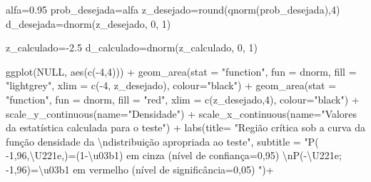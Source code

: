 \documentclass[
]{book}
\newenvironment{Shaded}{\begin{snugshade}}{\end{snugshade}}
\newcommand{\AttributeTok}[1]{\textcolor[rgb]{0.77,0.63,0.00}{#1}}
\newcommand{\ConstantTok}[1]{\textcolor[rgb]{0.00,0.00,0.00}{#1}}
\newcommand{\DecValTok}[1]{\textcolor[rgb]{0.00,0.00,0.81}{#1}}
\newcommand{\FloatTok}[1]{\textcolor[rgb]{0.00,0.00,0.81}{#1}}
\newcommand{\FunctionTok}[1]{\textcolor[rgb]{0.00,0.00,0.00}{#1}}
\newcommand{\NormalTok}[1]{#1}
\newcommand{\OtherTok}[1]{\textcolor[rgb]{0.56,0.35,0.01}{#1}}
\newcommand{\SpecialCharTok}[1]{\textcolor[rgb]{0.00,0.00,0.00}{#1}}
\newcommand{\StringTok}[1]{\textcolor[rgb]{0.31,0.60,0.02}{#1}}
\begin{document}
\begin{Shaded}
\begin{Highlighting}[]
\NormalTok{alfa}\OtherTok{=}\FloatTok{0.95}
\NormalTok{prob\_desejada}\OtherTok{=}\NormalTok{alfa}
\NormalTok{z\_desejado}\OtherTok{=}\FunctionTok{round}\NormalTok{(}\FunctionTok{qnorm}\NormalTok{(prob\_desejada),}\DecValTok{4}\NormalTok{)}
\NormalTok{d\_desejada}\OtherTok{=}\FunctionTok{dnorm}\NormalTok{(z\_desejado, }\DecValTok{0}\NormalTok{, }\DecValTok{1}\NormalTok{)}

\NormalTok{z\_calculado}\OtherTok{=}\SpecialCharTok{{-}}\FloatTok{2.5}
\NormalTok{d\_calculado}\OtherTok{=}\FunctionTok{dnorm}\NormalTok{(z\_calculado, }\DecValTok{0}\NormalTok{, }\DecValTok{1}\NormalTok{)}




\FunctionTok{ggplot}\NormalTok{(}\ConstantTok{NULL}\NormalTok{, }\FunctionTok{aes}\NormalTok{(}\FunctionTok{c}\NormalTok{(}\SpecialCharTok{{-}}\DecValTok{4}\NormalTok{,}\DecValTok{4}\NormalTok{))) }\SpecialCharTok{+}
  \FunctionTok{geom\_area}\NormalTok{(}\AttributeTok{stat =} \StringTok{"function"}\NormalTok{, }
            \AttributeTok{fun =}\NormalTok{ dnorm, }
            \AttributeTok{fill =} \StringTok{"lightgrey"}\NormalTok{, }
            \AttributeTok{xlim =} \FunctionTok{c}\NormalTok{(}\SpecialCharTok{{-}}\DecValTok{4}\NormalTok{, z\_desejado),}
            \AttributeTok{colour=}\StringTok{"black"}\NormalTok{) }\SpecialCharTok{+}
  \FunctionTok{geom\_area}\NormalTok{(}\AttributeTok{stat =} \StringTok{"function"}\NormalTok{, }
            \AttributeTok{fun =}\NormalTok{ dnorm, }
            \AttributeTok{fill =} \StringTok{"red"}\NormalTok{, }
            \AttributeTok{xlim =} \FunctionTok{c}\NormalTok{(z\_desejado,}\DecValTok{4}\NormalTok{),}
            \AttributeTok{colour=}\StringTok{"black"}\NormalTok{) }\SpecialCharTok{+}
  \FunctionTok{scale\_y\_continuous}\NormalTok{(}\AttributeTok{name=}\StringTok{"Densidade"}\NormalTok{) }\SpecialCharTok{+}
  \FunctionTok{scale\_x\_continuous}\NormalTok{(}\AttributeTok{name=}\StringTok{"Valores da estatística calculada para o teste"}\NormalTok{)  }\SpecialCharTok{+}
  \FunctionTok{labs}\NormalTok{(}\AttributeTok{title=} 
         \StringTok{"Região crítica sob a curva da função densidade da }\SpecialCharTok{\textbackslash{}n}\StringTok{distribuição apropriada ao teste"}\NormalTok{, }
       \AttributeTok{subtitle =} \StringTok{"P( {-}1,96,\textbackslash{}U221e,)=(1{-}\textbackslash{}u03b1) em cinza (nível de confiança=0,95) }\SpecialCharTok{\textbackslash{}n}\StringTok{P({-}\textbackslash{}U221e; {-}1,96)=\textbackslash{}u03b1 em vermelho (nível de significância=0,05) "}\NormalTok{)}\SpecialCharTok{+}

\end{Highlighting}
\end{Shaded}
\end{document}
